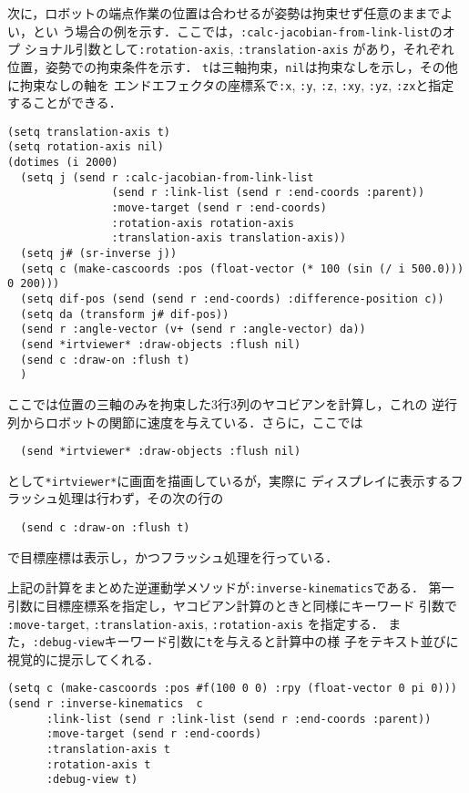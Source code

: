 次に，ロボットの端点作業の位置は合わせるが姿勢は拘束せず任意のままでよい，とい
う場合の例を示す．ここでは，\verb|:calc-jacobian-from-link-list|のオプ
ショナル引数として\verb|:rotation-axis|, \verb|:translation-axis|
があり，それぞれ位置，姿勢での拘束条件を示す．
\verb|t|は三軸拘束，\verb|nil|は拘束なしを示し，その他に拘束なしの軸を
エンドエフェクタの座標系で\verb|:x|, \verb|:y|, \verb|:z|, \verb|:xy|,
\verb|:yz|, \verb|:zx|と指定することができる．

{\baselineskip=10pt
\begin{verbatim}
(setq translation-axis t)
(setq rotation-axis nil)
(dotimes (i 2000)
  (setq j (send r :calc-jacobian-from-link-list
                (send r :link-list (send r :end-coords :parent))
                :move-target (send r :end-coords)
                :rotation-axis rotation-axis
                :translation-axis translation-axis))
  (setq j# (sr-inverse j))
  (setq c (make-cascoords :pos (float-vector (* 100 (sin (/ i 500.0))) 0 200)))
  (setq dif-pos (send (send r :end-coords) :difference-position c))
  (setq da (transform j# dif-pos))
  (send r :angle-vector (v+ (send r :angle-vector) da))
  (send *irtviewer* :draw-objects :flush nil)
  (send c :draw-on :flush t)
  )
\end{verbatim}
}

ここでは位置の三軸のみを拘束した3行3列のヤコビアンを計算し，これの
逆行列からロボットの関節に速度を与えている．さらに，ここでは
{\baselineskip=10pt
\begin{verbatim}
  (send *irtviewer* :draw-objects :flush nil)
\end{verbatim}
}
として\verb|*irtviewer*|に画面を描画しているが，実際に
ディスプレイに表示するフラッシュ処理は行わず，その次の行の
{\baselineskip=10pt
\begin{verbatim}
  (send c :draw-on :flush t)
\end{verbatim}
}
で目標座標は表示し，かつフラッシュ処理を行っている．

上記の計算をまとめた逆運動学メソッドが\verb|:inverse-kinematics|である．
第一引数に目標座標系を指定し，ヤコビアン計算のときと同様にキーワード
引数で
\verb|:move-target|, \verb|:translation-axis|, \verb|:rotation-axis|
を指定する．
また，\verb|:debug-view|キーワード引数に\verb|t|を与えると計算中の様
子をテキスト並びに視覚的に提示してくれる．
{\baselineskip=10pt
\begin{verbatim}
(setq c (make-cascoords :pos #f(100 0 0) :rpy (float-vector 0 pi 0)))
(send r :inverse-kinematics  c
      :link-list (send r :link-list (send r :end-coords :parent))
      :move-target (send r :end-coords)
      :translation-axis t
      :rotation-axis t
      :debug-view t)
\end{verbatim}
}


